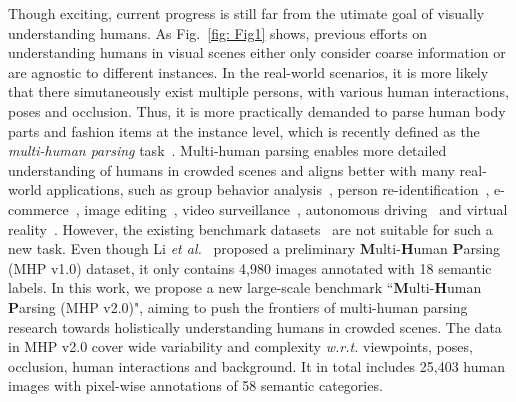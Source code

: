 \documentclass[10pt,twocolumn,letterpaper]{article}
\theoremstyle{definition}
\theoremstyle{remark}
\begin{document}
Though exciting, current progress is still far from the utimate goal of visually understanding humans. As Fig.~\ref{fig: Fig1} shows, previous efforts on understanding humans in visual scenes either only consider coarse information or are agnostic to different instances.  In the real-world scenarios, it is more likely that there simutaneously exist multiple persons, with various human interactions, poses and occlusion. Thus, it is more practically demanded to parse human body parts and fashion items at the instance level, which is recently defined as the \emph{multi-human parsing} task~\cite{li2017towards}. Multi-human parsing enables more detailed understanding of humans in crowded scenes and aligns better with many real-world applications, such as group behavior analysis~\cite{gan2016concepts}, person re-identification~\cite{zhao2013unsupervised}, e-commerce~\cite{turban2002electronic}, image editing~\cite{xu2016deep}, video surveillance~\cite{collins2000system}, autonomous driving~\cite{cordts2016cityscapes} and virtual reality~\cite{lin2016virtual}. However, the existing benchmark datasets~\cite{dollar2012pedestrian, everingham2015pascal, lin2014microsoft, gong2017look} are not suitable for such a new task. Even though Li \emph{et al.}~\cite{li2017towards} proposed a preliminary \textbf{M}ulti-\textbf{H}uman \textbf{P}arsing (MHP v1.0) dataset, it only contains 4{,}980 images annotated with 18 semantic labels. In this work, we propose a new large-scale benchmark ``\textbf{M}ulti-\textbf{H}uman \textbf{P}arsing (MHP v2.0)", aiming to push the frontiers of multi-human parsing research towards holistically understanding humans in crowded scenes. The data in MHP v2.0 cover wide variability and complexity \emph{w.r.t.} viewpoints, poses, occlusion, human interactions and background. It in total includes 25{,}403 human images with pixel-wise annotations of 58 semantic categories.
\end{document}
